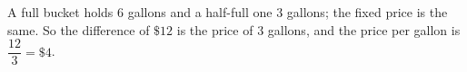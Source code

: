 A full bucket holds $6$ gallons and a half-full one $3$ gallons; the fixed price is the same. So the difference of $\$12$ is the price of $3$ gallons, and the price per gallon is $\dfrac{12}{3}=\boxed{\$4}$.
